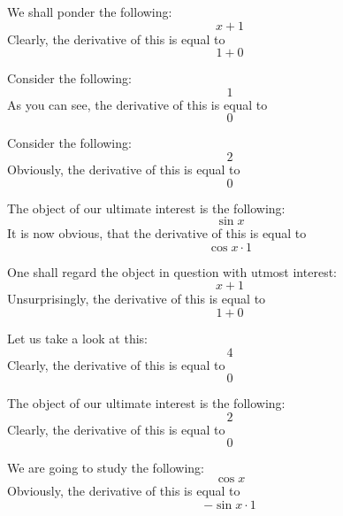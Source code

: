 \documentclass{article}
\begin{document}
We shall ponder the following:
\begin{equation}
x + 1 
\end{equation}
Clearly, the derivative of this is equal to
\begin{equation}
1 + 0 
\end{equation}

Consider the following:
\begin{equation}
1 
\end{equation}
As you can see, the derivative of this is equal to
\begin{equation}
0 
\end{equation}

Consider the following:
\begin{equation}
2 
\end{equation}
Obviously, the derivative of this is equal to
\begin{equation}
0 
\end{equation}

The object of our ultimate interest is the following:
\begin{equation}
\sin x 
\end{equation}
It is now obvious, that the derivative of this is equal to
\begin{equation}
\cos x \cdot 1 
\end{equation}

One shall regard the object in question with utmost interest:
\begin{equation}
x + 1 
\end{equation}
Unsurprisingly, the derivative of this is equal to
\begin{equation}
1 + 0 
\end{equation}

Let us take a look at this:
\begin{equation}
4 
\end{equation}
Clearly, the derivative of this is equal to
\begin{equation}
0 
\end{equation}

The object of our ultimate interest is the following:
\begin{equation}
2 
\end{equation}
Clearly, the derivative of this is equal to
\begin{equation}
0 
\end{equation}

We are going to study the following:
\begin{equation}
\cos x 
\end{equation}
Obviously, the derivative of this is equal to
\begin{equation}
-\sin x \cdot 1 
\end{equation}
\end{document}
